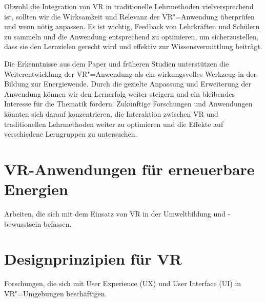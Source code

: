 \documentclass[draft]{vutinfth} %
\begin{document}
Obwohl die Integration von VR in traditionelle Lehrmethoden vielversprechend ist, sollten wir die Wirksamkeit und Relevanz der VR"=Anwendung überprüfen und wenn nötig anpassen. Es ist wichtig, Feedback von Lehrkräften und Schülern zu sammeln und die Anwendung entsprechend zu optimieren, um sicherzustellen, dass sie den Lernzielen gerecht wird und effektiv zur Wissensvermittlung beiträgt.

Die Erkenntnisse aus dem Paper und früheren Studien unterstützen die Weiterentwicklung der VR"=Anwendung als ein wirkungsvolles Werkzeug in der Bildung zur Energiewende. Durch die gezielte Anpassung und Erweiterung der Anwendung können wir den Lernerfolg weiter steigern und ein bleibendes Interesse für die Thematik fördern. Zukünftige Forschungen und Anwendungen könnten sich darauf konzentrieren, die Interaktion zwischen VR und traditionellen Lehrmethoden weiter zu optimieren und die Effekte auf verschiedene Lerngruppen zu untersuchen.




\section{VR-Anwendungen für erneuerbare Energien}
Arbeiten, die sich mit dem Einsatz von VR in der Umweltbildung und -bewusstsein befassen.

\section{Designprinzipien für VR}
Forschungen, die sich mit User Experience (UX) und User Interface (UI) in VR"=Umgebungen beschäftigen.

\backmatter

\listoffigures %



\printindex

\printglossaries


% 

\end{document}
